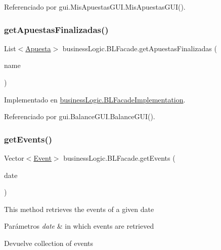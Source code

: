 Referenciado por gui.\+Mis\+Apuestas\+G\+U\+I.\+Mis\+Apuestas\+G\+U\+I().

\mbox{\label{interfacebusinessLogic_1_1BLFacade_aeface90d3879409333ceb8ab9cf134e0}} 
\subsubsection{\texorpdfstring{getApuestasFinalizadas()}{getApuestasFinalizadas()}}
{\footnotesize\ttfamily List$<$\mbox{\hyperlink{classdomain_1_1Apuesta}{Apuesta}}$>$ business\+Logic.\+B\+L\+Facade.\+get\+Apuestas\+Finalizadas (\begin{DoxyParamCaption}\item[{String}]{name }\end{DoxyParamCaption})}



Implementado en \mbox{\hyperlink{classbusinessLogic_1_1BLFacadeImplementation_a6e151a43915c198904fe8cafdb26ed2c}{business\+Logic.\+B\+L\+Facade\+Implementation}}.



Referenciado por gui.\+Balance\+G\+U\+I.\+Balance\+G\+U\+I().

\mbox{\label{interfacebusinessLogic_1_1BLFacade_a9db26f96faa50c91cb53fb831695c98f}} 
\subsubsection{\texorpdfstring{getEvents()}{getEvents()}}
{\footnotesize\ttfamily Vector$<$\mbox{\hyperlink{classdomain_1_1Event}{Event}}$>$ business\+Logic.\+B\+L\+Facade.\+get\+Events (\begin{DoxyParamCaption}\item[{Date}]{date }\end{DoxyParamCaption})}

This method retrieves the events of a given date


\begin{DoxyParams}{Parámetros}
{\em date} & in which events are retrieved \\
\hline
\end{DoxyParams}
\begin{DoxyReturn}{Devuelve}
collection of events 
\end{DoxyReturn}


